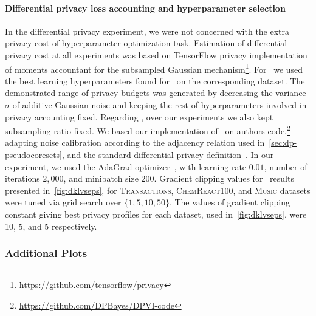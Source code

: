 \paragraph{Differential privacy loss accounting and hyperparameter selection}  In the differential privacy experiment, we were not concerned with the extra privacy cost of hyperparameter optimization task.  Estimation of differential privacy cost at all experiments was based on TensorFlow privacy implementation of moments accountant for the subsampled Gaussian mechanism\footnote{\href{https://github.com/tensorflow/privacy}{https://github.com/tensorflow/privacy}}. 
For \dpsvi~we used the best learning hyperparameters found for \psvi~on the corresponding dataset. The demonstrated range of privacy budgets was generated by decreasing the variance $ \sigma $ of additive Gaussian noise and keeping the rest of hyperparameters involved in privacy accounting fixed.  
Regarding \dpvi, over our experiments we also kept subsampling ratio fixed. We based our implementation of \dpvi~on authors code,\footnote{\href{https://github.com/DPBayes/DPVI-code}{https://github.com/DPBayes/DPVI-code}} adapting noise calibration according to the adjacency relation used in~\cref{sec:dp-pseudocoresets}, and the standard differential privacy definition~\citep{dwork14}. In our experiment, we used the AdaGrad optimizer~\citep{duchi11}, with learning rate $0.01$, number of iterations $2,000$, and minibatch size $200$. Gradient clipping values for \dpvi~results presented in~\cref{fig:dklvseps}, for \textsc{Transactions}, \textsc{ChemReact100}, and \textsc{Music} datasets were tuned via grid search over ${\{1, 5, 10, 50\}}$. The values of gradient clipping constant giving best privacy profiles for each dataset, used in~\cref{fig:dklvseps}, were 10, 5, and 5 respectively. 



\subsubsection{Additional Plots}
\label{supp:cpu_timings}

